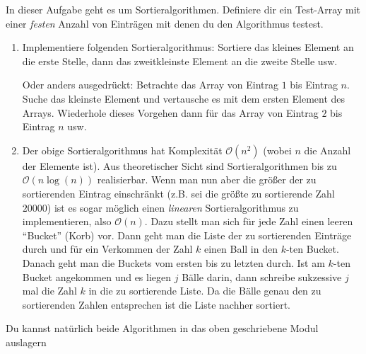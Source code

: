 \documentclass{uebungszettel}
\begin{document}
\begin{aufg} In dieser Aufgabe geht es um Sortieralgorithmen. Definiere dir ein Test-Array mit einer \emph{festen}
 Anzahl von Einträgen mit denen du den Algorithmus testest. 
\begin{enumerate} 
\item Implementiere folgenden Sortieralgorithmus: Sortiere das kleines Element an die erste Stelle, dann das 
zweitkleinste Element an die zweite Stelle usw. 

Oder anders ausgedrückt: Betrachte das Array von Eintrag $1$ bis Eintrag $n$. Suche das kleinste Element und 
vertausche es mit dem ersten Element des Arrays. Wiederhole dieses Vorgehen dann für das Array von Eintrag $2$ bis 
Eintrag $n$ usw.

\item Der obige Sortieralgorithmus hat Komplexität $\mathcal O(n^2)$ (wobei $n$ die Anzahl der Elemente ist). Aus theoretischer Sicht sind Sortieralgorithmen bis zu $\mathcal O(n \log(n))$ realisierbar. Wenn man nun aber die größer der zu sortierenden Eintrag einschränkt (z.B. sei die größte zu sortierende Zahl $20000$) ist es sogar möglich einen \emph{linearen} Sortieralgorithmus zu implementieren, also $\mathcal O(n)$. Dazu stellt man sich für jede Zahl einen leeren ``Bucket'' (Korb) vor. Dann geht man die Liste der zu sortierenden Einträge durch und für ein Verkommen der Zahl $k$ einen Ball in den $k$-ten Bucket. Danach geht man die Buckets vom ersten bis zu letzten durch. Ist am $k$-ten Bucket angekommen und es liegen $j$ Bälle darin, dann schreibe sukzessive $j$ mal die Zahl $k$ in die zu sortierende Liste. Da die Bälle genau den zu sortierenden Zahlen entsprechen ist die Liste nachher sortiert. 
\end{enumerate}
\noindent Du kannst natürlich  beide Algorithmen in das oben geschriebene Modul auslagern
\end{aufg}
\end{document}
